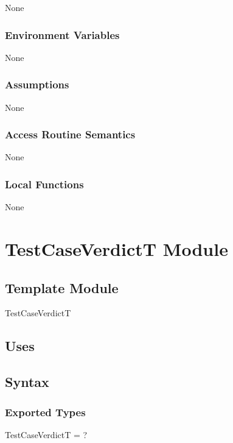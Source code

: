 \documentclass[12pt, titlepage]{article}
\begin{document}
None

\subsubsection{Environment Variables}

None

\subsubsection{Assumptions}

None

\subsubsection{Access Routine Semantics}

None

\subsubsection{Local Functions}

None



\newpage

\section{TestCaseVerdictT Module} \label{TestCaseVerdictT} 

\subsection{Template Module}

TestCaseVerdictT

\subsection{Uses}


\subsection{Syntax}

\subsubsection{Exported Types}

TestCaseVerdictT = ?
\end{document}
